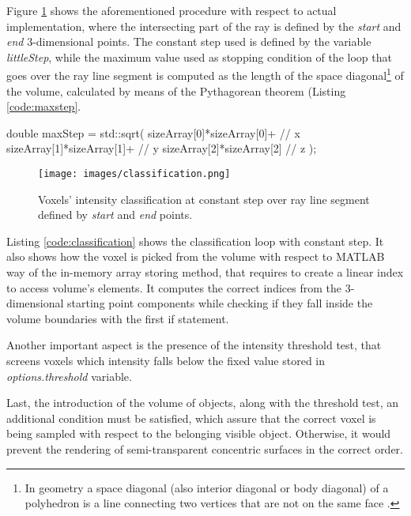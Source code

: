 \documentclass[12pt,a4paper]{extarticle}
\begin{document}
Figure \ref{fig:segmentclassify} shows the aforementioned procedure with respect to actual implementation, where the intersecting part of the ray is defined by the \textit{start} and \textit{end} 3-dimensional points.
The constant step used is defined by the variable \textit{littleStep}, while the maximum value used as stopping condition of the loop that goes over the ray line segment is computed as the length of the space diagonal\footnote{In geometry a space diagonal (also interior diagonal or body diagonal) of a polyhedron is a line connecting two vertices that are not on the same face \cite{space_diagonal:6}.} of the volume, calculated by means of the Pythagorean theorem (Listing \ref{code:maxstep}.

\begin{cpp}[caption={Computed volume's space diagonal by means of the \textit{"Pythagorean formula"}, where \textit{sizeArray} is an array storing the volume sizes in each 3-dimensional dimension.},label=code:maxstep]
double maxStep = std::sqrt(
						sizeArray[0]*sizeArray[0]+ // x
						sizeArray[1]*sizeArray[1]+ // y
						sizeArray[2]*sizeArray[2]  // z
						);
\end{cpp}

\begin{figure}[hbtp]
\centering
\texttt{[image: images/classification.png]}
\caption{Voxels' intensity classification at constant step over ray line segment defined by \textit{start} and \textit{end} points.}
\label{fig:segmentclassify}
\end{figure}

Listing \ref{code:classification} shows the classification loop with constant step. It also shows how the voxel is picked from the volume with respect to MATLAB way of the in-memory array storing method, that requires to create a linear index to access volume's elements. It computes the correct indices from the 3-dimensional starting point components while checking if they fall inside the volume boundaries with the first if statement.

Another important aspect is the presence of the intensity threshold test, that screens voxels which intensity falls below the fixed value stored in \textit{options.threshold} variable.

Last, the introduction of the volume of objects, along with the threshold test, an additional condition must be satisfied, which assure that the correct voxel is being sampled with respect to the belonging visible object. Otherwise, it would prevent the rendering of semi-transparent concentric surfaces in the correct order.
 
\end{document}
